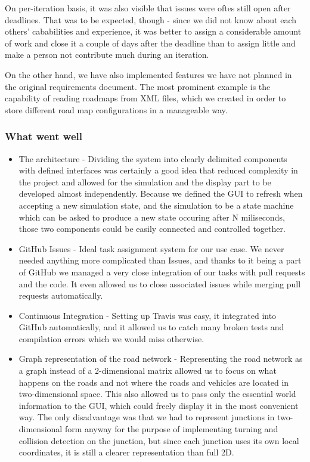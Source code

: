 \documentclass[a4paper,12pt]{article}
\begin{document}
On per-iteration basis, it was also visible that issues were oftes still open after deadlines. That was to be expected, though - since we did not know about each others' cababilities and experience, it was better to assign a considerable amount of work and close it a couple of days after the deadline than to assign little and make a person not contribute much during an iteration.

On the other hand, we have also implemented features we have not planned in the original requirements document. The most prominent example is the capability of reading roadmaps from XML files, which we created in order to store different road map configurations in a manageable way.

\subsubsection*{What went well}
\begin{itemize}
	\item The architecture - Dividing the system into clearly delimited components with defined interfaces was certainly a good idea that reduced complexity in the project and allowed for the simulation and the display part to be developed almost independently. Because we defined the GUI to refresh when accepting a new simulation state, and the simulation to be a state machine which can be asked to produce a new state occuring after N miliseconds, those two components could be easily connected and controlled together.
	\item GitHub Issues - Ideal task assignment system for our use case. We never needed anything more complicated than Issues, and thanks to it being a part of GitHub we managed a very close integration of our tasks with pull requests and the code. It even allowed us to close associated issues while merging pull requests automatically.
	\item Continuous Integration - Setting up Travis was easy, it integrated into GitHub automatically, and it allowed us to catch many broken tests and compilation errors which we would miss otherwise.
	\item Graph representation of the road network - Representing the road network as a graph instead of a 2-dimensional matrix allowed us to focus on what happens on the roads and not where the roads and vehicles are located in two-dimensional space. This also allowed us to pass only the essential world information to the GUI, which could freely display it in the most convenient way. The only disadvantage was that we had to represent junctions in two-dimensional form anyway for the purpose of implementing turning and collision detection on the junction, but since each junction uses its own local coordinates, it is still a clearer representation than full 2D.
\end{itemize}
\end{document}
